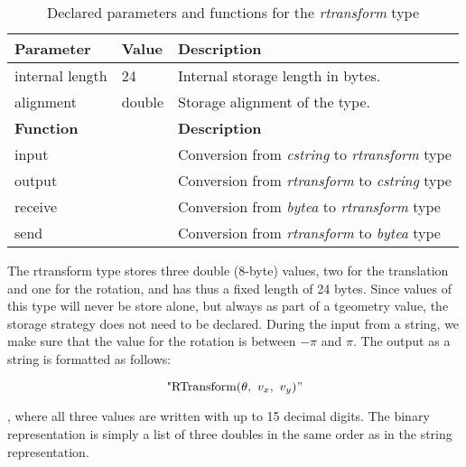 \begin{table}[h!]
    \centering
    \begin{tabularx}{\textwidth}{|l|l|X|}
    \hline
    \textbf{Parameter}  & \textbf{Value}        & \textbf{Description} \\ 
    \hline
    internal length     & 24                    & Internal storage length in bytes. \\
    \hline
    alignment           & double                & Storage alignment of the type. \\
    \hline
    \multicolumn{2}{|l|}{\textbf{Function}}     & \textbf{Description} \\ 
    \hline
    \multicolumn{2}{|l|}{input}                 & Conversion from \textit{cstring} to \textit{rtransform} type \\
    \hline
    \multicolumn{2}{|l|}{output}                & Conversion from \textit{rtransform} to \textit{cstring} type \\
    \hline
    \multicolumn{2}{|l|}{receive}               & Conversion from \textit{bytea} to \textit{rtransform} type \\
    \hline
    \multicolumn{2}{|l|}{send}                  & Conversion from \textit{rtransform} to \textit{bytea} type \\
    \hline
    \end{tabularx}
    \caption{Declared parameters and functions for the \textit{rtransform} type}
    \label{table:rtransform_type_declaration}
\end{table}

The rtransform type stores three double (8-byte) values, two for the translation and one for the rotation, and has thus a fixed length of 24 bytes. Since values of this type will never be store alone, but always as part of a tgeometry value, the storage strategy does not need to be declared. During the input from a string, we make sure that the value for the rotation is between $-\pi$ and $\pi$. The output as a string is formatted as follows:

\[
    \text{"RTransform(}\theta,\ v_x,\ v_y{)"}
\]

, where all three values are written with up to 15 decimal digits. The binary representation is simply a list of three doubles in the same order as in the string representation.

